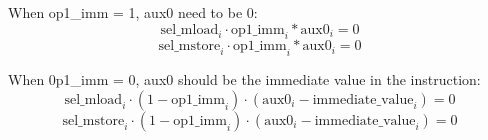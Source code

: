 When op1\_imm = 1, aux0 need to be 0:
\[ \mathrm{sel\_mload}_i \cdot \mathrm{op1\_imm}_i * \mathrm{aux0}_i = 0 \]
\[ \mathrm{sel\_mstore}_i \cdot \mathrm{op1\_imm}_i * \mathrm{aux0}_i = 0 \]

When 0p1\_imm = 0, aux0 should be the immediate value in the instruction:
\[ \mathrm{sel\_mload}_i \cdot (1 - \mathrm{op1\_imm}_i) \cdot (\mathrm{aux0}_i - \mathrm{immediate\_value}_i)=0 \]
\[ \mathrm{sel\_mstore}_i \cdot (1 - \mathrm{op1\_imm}_i) \cdot (\mathrm{aux0}_i - \mathrm{immediate\_value}_i)=0 \]
